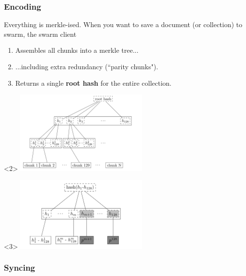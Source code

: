\documentclass{beamer}
\begin{document}
\subsubsection{Encoding}

\begin{frame}[t]{Everything is merkle-ised.}
When you want to save a document (or collection) to swarm, the swarm client
\begin{enumerate}
 \item<2-> Assembles all chunks into a merkle tree...
 \item<3-> ...including extra redundancy (``parity chunks").
 \item<4-> Returns a single \textbf{root hash} for the entire collection.
\end{enumerate}

\begin{center}
 \begin{onlyenv}<2>
  \includegraphics[width=0.5\textwidth]{chunk-tree.png}
 \end{onlyenv}
 \begin{onlyenv}<3>
  \includegraphics[width=0.5\textwidth]{erasure-coded-tree.png}
 \end{onlyenv}

\end{center}



\end{frame}



\subsubsection{Syncing}
\end{document}
